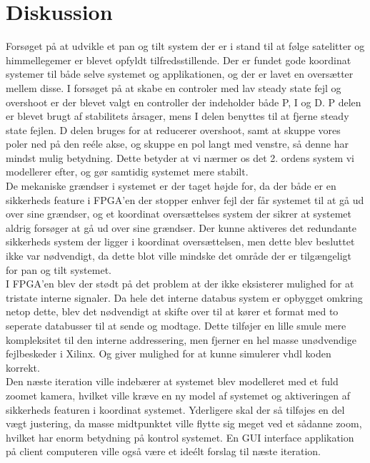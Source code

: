 \section{Diskussion}

Forsøget på at udvikle et pan og tilt system der er i stand til at følge satelitter og himmellegemer er blevet opfyldt tilfredsstillende. Der er fundet gode koordinat systemer til både selve systemet og applikationen, og der er lavet en oversætter mellem disse. I forsøget på at skabe en controler med lav steady state fejl og overshoot er der blevet valgt en controller der indeholder både P, I og D. P delen er blevet brugt af stabilitets årsager, mens I delen benyttes til at fjerne steady state fejlen. D delen bruges for at reducerer overshoot, samt at skuppe vores poler ned på den reéle akse, og skuppe en pol langt med venstre, så denne har mindst mulig betydning. Dette betyder at vi nærmer os det 2. ordens system vi modellerer efter, og gør samtidig systemet mere stabilt.
\\
De mekaniske grændser i systemet er der taget højde for, da der både er en sikkerheds feature i FPGA'en der stopper enhver fejl der får systemet til at gå ud over sine grændser, og et koordinat oversættelses system der sikrer at systemet aldrig forsøger at gå ud over sine grændser. Der kunne aktiveres det redundante sikkerheds system der ligger i koordinat oversættelsen, men dette blev besluttet ikke var nødvendigt, da dette blot ville mindske det område der er tilgængeligt for pan og tilt systemet.
\\
I FPGA'en blev der stødt på det problem at der ikke eksisterer mulighed for at tristate interne signaler. Da hele det interne databus system er opbygget omkring netop dette, blev det nødvendigt at skifte over til at kører et format med to seperate databusser til at sende og modtage. Dette tilføjer en lille smule mere kompleksitet til den interne addressering, men fjerner en hel masse unødvendige fejlbeskeder i Xilinx. Og giver mulighed for at kunne simulerer vhdl koden korrekt.
\\
Den næste iteration ville indebærer at systemet blev modelleret med et fuld zoomet kamera, hvilket ville kræve en ny model af systemet og aktiveringen af sikkerheds featuren i koordinat systemet. Yderligere skal der så tilføjes en del vægt justering, da masse midtpunktet ville flytte sig meget ved et sådanne zoom, hvilket har enorm betydning på kontrol systemet. En GUI interface applikation på client computeren ville også være et ideélt forslag til næste iteration.




